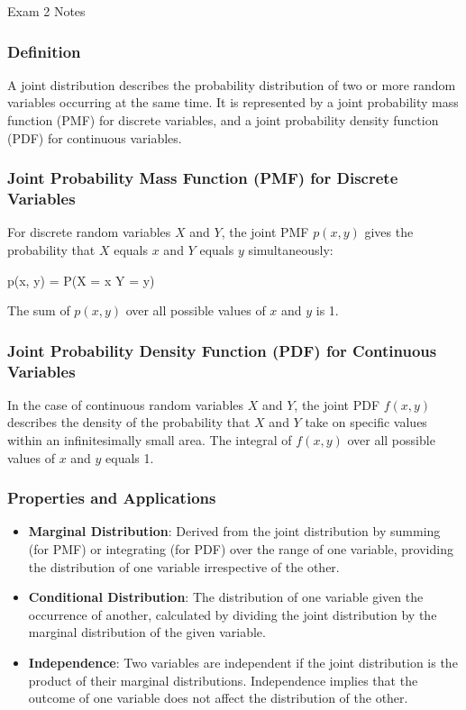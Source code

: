 \begin{examnotes}{Exam 2 Notes}
    \subsubsection*{Definition}
    
    A joint distribution describes the probability distribution of two or more random variables occurring at the same time. It is represented by a joint probability mass function (PMF) for discrete 
    variables, and a joint probability density function (PDF) for continuous variables.
    
    \subsubsection*{Joint Probability Mass Function (PMF) for Discrete Variables}
    
    For discrete random variables $X$ and $Y$, the joint PMF $p(x, y)$ gives the probability that $X$ equals $x$ and $Y$ equals $y$ simultaneously:
    \begin{center}
        \begin{highlightbox}
            p(x, y) = P(X = x  Y = y)
        \end{highlightbox}
    \end{center}
    The sum of $p(x, y)$ over all possible values of $x$ and $y$ is 1.
    
    \subsubsection*{Joint Probability Density Function (PDF) for Continuous Variables}
    
    In the case of continuous random variables $X$ and $Y$, the joint PDF $f(x, y)$ describes the density of the probability that $X$ and $Y$ take on specific values within an infinitesimally small 
    area. The integral of $f(x, y)$ over all possible values of $x$ and $y$ equals 1.
    
    \subsubsection*{Properties and Applications}
    
    \begin{itemize}
        \item \textbf{Marginal Distribution}: Derived from the joint distribution by summing (for PMF) or integrating (for PDF) over the range of one variable, providing the distribution of one 
        variable irrespective of the other.
        \item \textbf{Conditional Distribution}: The distribution of one variable given the occurrence of another, calculated by dividing the joint distribution by the marginal distribution of the 
        given variable.
        \item \textbf{Independence}: Two variables are independent if the joint distribution is the product of their marginal distributions. Independence implies that the outcome of one variable 
        does not affect the distribution of the other.
    \end{itemize}
    

\end{examnotes}
